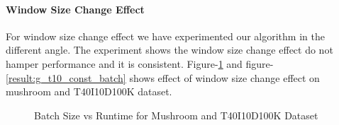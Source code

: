     \paragraph{Window Size Change Effect}For window size change effect we have experimented our algorithm in the different angle. The experiment shows the window size change effect do not hamper performance and it is consistent. Figure-\ref{result:g_m_const_batch} and figure-\ref{result:g_t10_const_batch} shows effect of window size change effect on mushroom and T40I10D100K dataset.
        \begin{figure}[h]
        \centering
            
            
        \caption{Batch Size vs Runtime for Mushroom and T40I10D100K Dataset }
        \label{result:g_m_const_batch}
        \end{figure}
